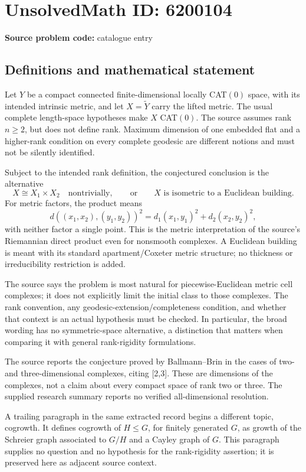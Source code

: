 \documentclass[11pt]{article}
\begin{document}
\section*{UnsolvedMath ID: 6200104}
\textbf{Source problem code:} catalogue entry
\subsection{Definitions and mathematical statement}
Let \(Y\) be a compact connected finite-dimensional locally CAT\((0)\) space, with its intended intrinsic metric, and let \(X=\widetilde Y\) carry the lifted metric. The usual complete length-space hypotheses make \(X\) CAT\((0)\). The source assumes rank \(n\ge2\), but does not define rank. Maximum dimension of one embedded flat and a higher-rank condition on every complete geodesic are different notions and must not be silently identified.

Subject to the intended rank definition, the conjectured conclusion is the alternative
\[
X\cong X_1\times X_2\quad\text{nontrivially},
\qquad\text{or}\qquad X\text{ is isometric to a Euclidean building}.
\]
For metric factors, the product means
\[
d((x_1,x_2),(y_1,y_2))^2=d_1(x_1,y_1)^2+d_2(x_2,y_2)^2,
\]
with neither factor a single point. This is the metric interpretation of the source's Riemannian direct product even for nonsmooth complexes. A Euclidean building is meant with its standard apartment/Coxeter metric structure; no thickness or irreducibility restriction is added.

The source says the problem is most natural for piecewise-Euclidean metric cell complexes; it does not explicitly limit the initial class to those complexes. The rank convention, any geodesic-extension/completeness condition, and whether that context is an actual hypothesis must be checked. In particular, the broad wording has no symmetric-space alternative, a distinction that matters when comparing it with general rank-rigidity formulations.

The source reports the conjecture proved by Ballmann--Brin in the cases of two- and three-dimensional complexes, citing [2,3]. These are dimensions of the complexes, not a claim about every compact space of rank two or three. The supplied research summary reports no verified all-dimensional resolution.

A trailing paragraph in the same extracted record begins a different topic, cogrowth. It defines cogrowth of \(H\le G\), for finitely generated \(G\), as growth of the Schreier graph associated to \(G/H\) and a Cayley graph of \(G\). This paragraph supplies no question and no hypothesis for the rank-rigidity assertion; it is preserved here as adjacent source context.
\end{document}
